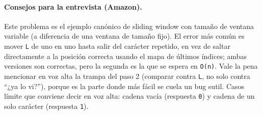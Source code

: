 \paragraph{Consejos para la entrevista (Amazon).} Este problema es el
ejemplo canónico de sliding window con tamaño de ventana variable (a
diferencia de una ventana de tamaño fijo). El error más común es mover
\texttt{L} de uno en uno hasta salir del carácter repetido, en vez de
saltar directamente a la posición correcta usando el mapa de últimos
índices; ambas versiones son correctas, pero la segunda es la que se
espera en \texttt{O(n)}. Vale la pena mencionar en voz alta la trampa del
paso 2 (comparar contra \texttt{L}, no solo contra ``¿ya lo vi?''), porque
es la parte donde más fácil se cuela un bug sutil. Casos límite que conviene
decir en voz alta: cadena vacía (respuesta \texttt{0}) y cadena de un solo
carácter (respuesta \texttt{1}).
